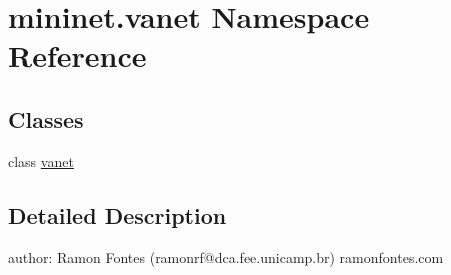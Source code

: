\hypertarget{namespacemininet_1_1vanet}{\section{mininet.\-vanet Namespace Reference}
\label{namespacemininet_1_1vanet}
}
\subsection*{Classes}
\begin{DoxyCompactItemize}
\item 
class \hyperlink{classmininet_1_1vanet_1_1vanet}{vanet}
\end{DoxyCompactItemize}


\subsection{Detailed Description}
\begin{DoxyVerb}author: Ramon Fontes (ramonrf@dca.fee.unicamp.br)
ramonfontes.com\end{DoxyVerb}
 